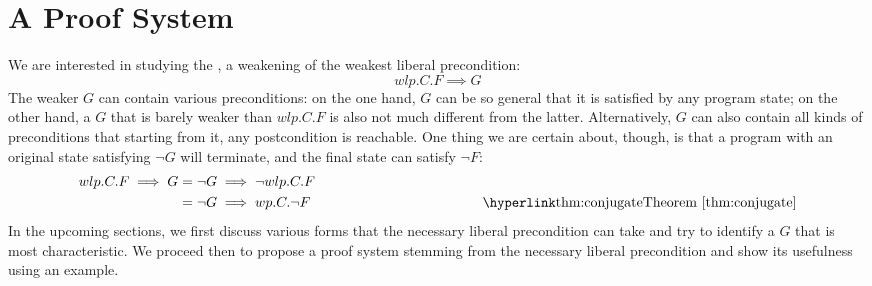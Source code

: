 \chapter{A Proof System}\label{ch:system} %





We are interested in studying the , a weakening of the weakest liberal precondition: 
$$wlp.C.F\implies G$$
The weaker $G$ can contain various preconditions: on the one hand, $G$ can be so general that it is satisfied by any program state; on the other hand, a $G$ that is barely weaker than $wlp.C.F$ is also not much different from the latter. 
Alternatively, $G$ can also contain all kinds of preconditions that starting from it, any postcondition is reachable. 
One thing we are certain about, though, is that a program with an original state satisfying $\neg G$ will terminate, and the final state can satisfy $\neg F$: 
\begin{align*}
wlp.C.F\implies G & = \neg G \implies \neg wlp.C.F \\
	& = \neg G \implies wp.C.\neg F 
	\hspace{0.3\textwidth} \tag*{\thm{conjugate}}
\end{align*}
In the upcoming sections, we first discuss various forms that the necessary liberal precondition can take and try to identify a $G$ that is most characteristic. 
We proceed then to propose a proof system stemming from the necessary liberal precondition and show its usefulness using an example. 

